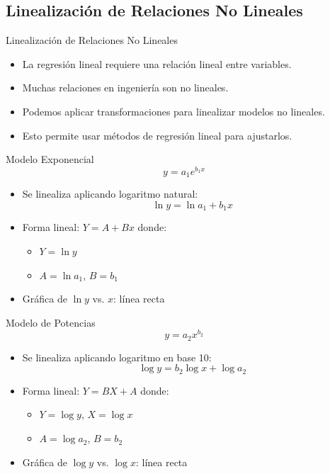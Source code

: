 \documentclass[main.tex]{subfiles}
\begin{document}
\subsection{Linealización de Relaciones No Lineales}
\begin{frame}{Linealización de Relaciones No Lineales}
  \begin{itemize}
    \item La regresión lineal requiere una relación lineal entre variables.
    \item Muchas relaciones en ingeniería son no lineales.
    \item Podemos aplicar transformaciones para linealizar modelos no lineales.
    \item Esto permite usar métodos de regresión lineal para ajustarlos.
  \end{itemize}
\end{frame}

\begin{frame}{Modelo Exponencial}
  \[
    y = a_1 e^{b_1 x}
  \]
  \begin{itemize}
    \item Se linealiza aplicando logaritmo natural:
    \[
      \ln y = \ln a_1 + b_1 x
    \]
    \item Forma lineal: \( Y = A + Bx \) donde:
    \begin{itemize}
      \item \( Y = \ln y \)
      \item \( A = \ln a_1 \), \( B = b_1 \)
    \end{itemize}
    \item Gráfica de \( \ln y \) vs. \( x \): línea recta
  \end{itemize}
\end{frame}

\begin{frame}{Modelo de Potencias}
  \[
    y = a_2 x^{b_2}
  \]
  \begin{itemize}
    \item Se linealiza aplicando logaritmo en base 10:
    \[
      \log y = b_2 \log x + \log a_2
    \]
    \item Forma lineal: \( Y = B X + A \) donde:
    \begin{itemize}
      \item \( Y = \log y \), \( X = \log x \)
      \item \( A = \log a_2 \), \( B = b_2 \)
    \end{itemize}
    \item Gráfica de \( \log y \) vs. \( \log x \): línea recta
  \end{itemize}
\end{frame}
\end{document}

